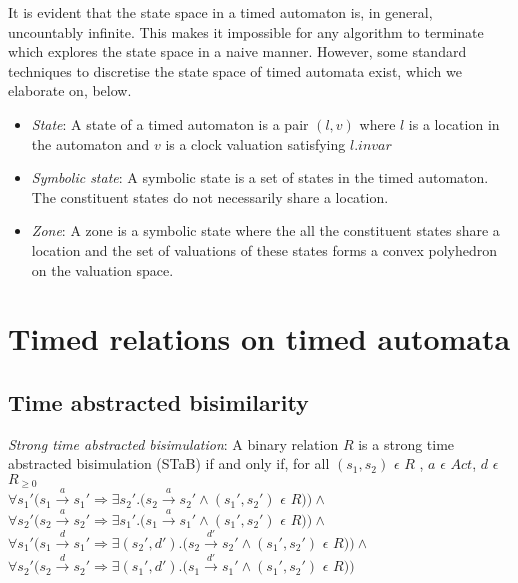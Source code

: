 \documentclass[a4paper]{llncs}
\begin{document}
It is evident that the state space in a timed automaton is, in
general, uncountably infinite. This makes it impossible for any
algorithm to terminate which explores the state space in a naive
manner. However, some standard techniques to discretise the state
space of timed automata exist, which we elaborate on, below.

\begin{itemize}

\item \emph{State}: A state of a timed automaton is a pair $(l, v)$
  where $l$ is a location in the automaton and $v$ is a clock
  valuation satisfying $l.invar$

\item \emph{Symbolic state}: A symbolic state is a set of states in
  the timed automaton. The constituent states do not necessarily share
  a location.

\item \emph{Zone}: A zone is a symbolic state where the all the
  constituent states share a location and the set of valuations of
  these states forms a convex polyhedron on the valuation space.

\end{itemize}

\section{Timed relations on timed automata}

\subsection{Time abstracted bisimilarity}

\begin{definition}  
  \emph{Strong time abstracted bisimulation}: A binary relation
  $R$ is a strong time abstracted bisimulation (STaB) if and only if, for all
  $(s_1, s_2)$ $\epsilon$ $R$ , $a$ $\epsilon$ $Act $, $d$ $\epsilon$ $R_{\ge 0}$\\
  $\forall s_1' (s_1 \xrightarrow{a} s_1' \Rightarrow \exists s_2'
  . (s_2 \xrightarrow{a} s_2' \wedge (s_1', s_2')$ $\epsilon$ $R ) )
  \wedge $ \\
  $\forall s_2' (s_2 \xrightarrow{a} s_2' \Rightarrow \exists s_1'
  . (s_1 \xrightarrow{a} s_1' \wedge (s_1', s_2')$ $\epsilon$ $R ) ) \wedge $ \\
  $\forall s_1' (s_1 \xrightarrow{d} s_1' \Rightarrow \exists (s_2',
  d')
  . (s_2 \xrightarrow{d'} s_2' \wedge (s_1', s_2')$ $\epsilon$ $R ) )
  \wedge $ \\
  $\forall s_2' (s_2 \xrightarrow{d} s_2' \Rightarrow \exists (s_1', d')
  . (s_1 \xrightarrow{d'} s_1' \wedge (s_1', s_2')$ $\epsilon$ $R ) ) $ \\
\end{definition}
\end{document}
